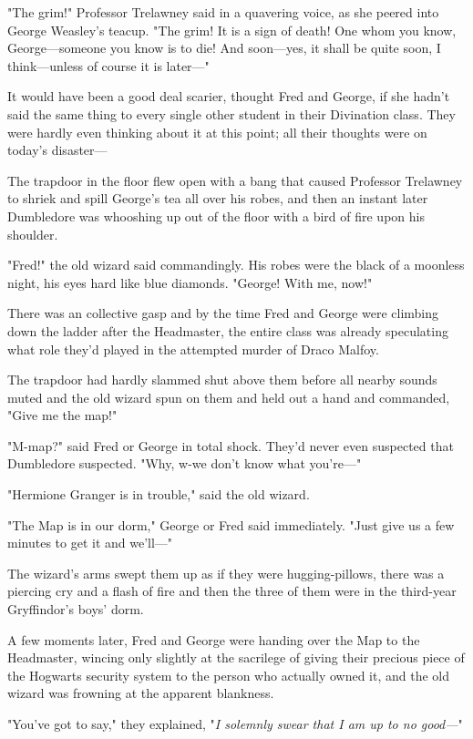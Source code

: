 "The grim!" Professor Trelawney said in a quavering voice, as she peered into 
George Weasley's teacup. "The grim! It is a sign of death! One whom you know, 
George---someone you know is to die! And soon---yes, it shall be quite soon, I 
think---unless of course it is later---"

It would have been a good deal scarier, thought Fred and George, if she hadn't 
said the same thing to every single other student in their Divination class. 
They were hardly even thinking about it at this point; all their thoughts were 
on today's disaster---

The trapdoor in the floor flew open with a bang that caused Professor Trelawney 
to shriek and spill George's tea all over his robes, and then an instant later 
Dumbledore was whooshing up out of the floor with a bird of fire upon his 
shoulder.

"Fred!" the old wizard said commandingly. His robes were the black of a 
moonless night, his eyes hard like blue diamonds. "George! With me, now!"

There was an collective gasp and by the time Fred and George were climbing down 
the ladder after the Headmaster, the entire class was already speculating what 
role they'd played in the attempted murder of Draco Malfoy.

The trapdoor had hardly slammed shut above them before all nearby sounds muted 
and the old wizard spun on them and held out a hand and commanded, "Give me the 
map!"

"M-map?" said Fred or George in total shock. They'd never even suspected that 
Dumbledore suspected. "Why, w-we don't know what you're---"

"Hermione Granger is in trouble," said the old wizard.

"The Map is in our dorm," George or Fred said immediately. "Just give us a few 
minutes to get it and we'll---"

The wizard's arms swept them up as if they were hugging-pillows, there was a 
piercing cry and a flash of fire and then the three of them were in the 
third-year Gryffindor's boys' dorm.

A few moments later, Fred and George were handing over the Map to the 
Headmaster, wincing only slightly at the sacrilege of giving their precious 
piece of the Hogwarts security system to the person who actually owned it, and 
the old wizard was frowning at the apparent blankness.

"You've got to say," they explained, "\emph{I solemnly swear that I am up to no 
good---}"

